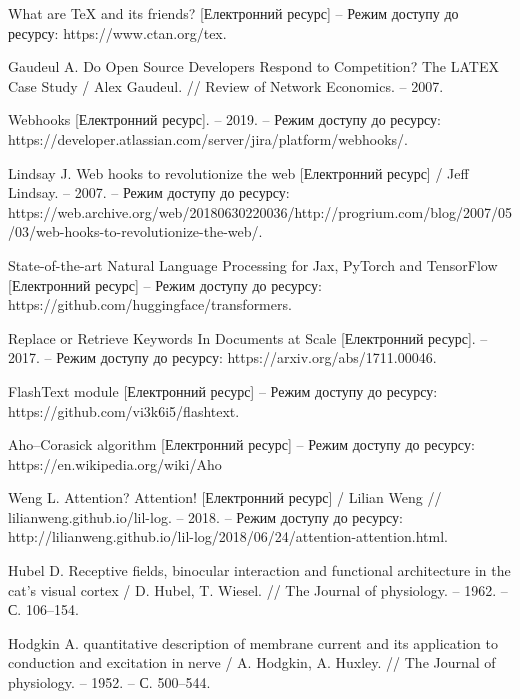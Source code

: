 \renewcommand\bibname{ПЕРЕЛІК ДЖЕРЕЛ ПОСИЛАННЯ}
\begin{thebibliography}{9}
    What are TeX and its friends? [Електронний ресурс] – Режим доступу до ресурсу: https://www.ctan.org/tex.

    Gaudeul A. Do Open Source Developers Respond to Competition? The LATEX Case Study / Alex Gaudeul. // Review of Network Economics. – 2007.

    Webhooks [Електронний ресурс]. – 2019. – Режим доступу до ресурсу: https://developer.atlassian.com/server/jira/platform/webhooks/.

    Lindsay J. Web hooks to revolutionize the web [Електронний ресурс] / Jeff Lindsay. – 2007. – Режим доступу до ресурсу: https://web.archive.org/web/20180630220036/http://progrium.com/blog/2007/05/03/web-hooks-to-revolutionize-the-web/.
    
    State-of-the-art Natural Language Processing for Jax, PyTorch and TensorFlow [Електронний ресурс] – Режим доступу до ресурсу: https://github.com/huggingface/transformers.

    Replace or Retrieve Keywords In Documents at Scale [Електронний ресурс]. – 2017. – Режим доступу до ресурсу: https://arxiv.org/abs/1711.00046.

    FlashText module [Електронний ресурс] – Режим доступу до ресурсу: https://github.com/vi3k6i5/flashtext.

    Aho–Corasick algorithm [Електронний ресурс] – Режим доступу до ресурсу: https://en.wikipedia.org/wiki/Aho%

    Weng L. Attention? Attention! [Електронний ресурс] / Lilian Weng // lilianweng.github.io/lil-log. – 2018. – Режим доступу до ресурсу: http://lilianweng.github.io/lil-log/2018/06/24/attention-attention.html.

    Hubel D. Receptive fields, binocular interaction and functional architecture in the cat’s visual cortex / D. Hubel, T. Wiesel. // The Journal of physiology. – 1962. – С. 106–154.

    Hodgkin A. quantitative description of membrane current and its application to conduction and excitation in nerve / A. Hodgkin, A. Huxley. // The Journal of physiology. – 1952. – С. 500–544.


\end{thebibliography}
